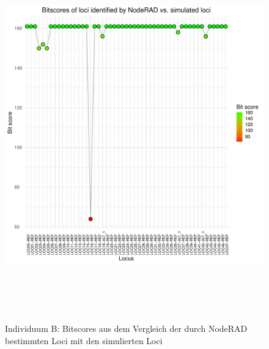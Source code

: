 \begin{figure}[H]
	\begin{center}
		\includegraphics[height=16cm]{bilder/evaluation/bitscores/B.plot_bitscores.pdf}
		\caption{Individuum B: Bitscores aus dem Vergleich der durch NodeRAD bestimmten Loci mit den simulierten Loci}
	\end{center}
\end{figure}

